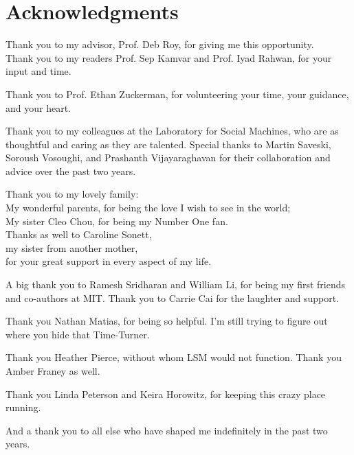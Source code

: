 
\section*{Acknowledgments}

Thank you to my advisor, Prof. Deb Roy, for giving me this opportunity.\\
Thank you to my readers Prof. Sep Kamvar and Prof. Iyad Rahwan, for your input and time.

Thank you to Prof. Ethan Zuckerman, for volunteering your time, your guidance, and your heart. 

Thank you to my colleagues at the Laboratory for Social Machines, who are as thoughtful and caring as they are talented. Special thanks to Martin Saveski, Soroush Vosoughi, and Prashanth Vijayaraghavan for their collaboration and advice over the past two years.

Thank you to my lovely family: \\
My wonderful parents, for being the love I wish to see in the world;  \\
My sister Cleo Chou, for being my Number One fan.  \\
Thanks as well to Caroline Sonett, \\
my sister from another mother, \\
for your great support in every aspect of my life.
  
A big thank you to Ramesh Sridharan and William Li, for being my first friends and co-authors at MIT. Thank you to Carrie Cai for the laughter and support.

Thank you Nathan Matias, for being so helpful. I'm still trying to figure out where you hide that Time-Turner.

Thank you Heather Pierce, without whom LSM would not function. Thank you Amber Franey as well.

Thank you Linda Peterson and Keira Horowitz, for keeping this crazy place running.

And a thank you to all else who have shaped me indefinitely in the past two years.

 
\afterpage{\blankpage}


